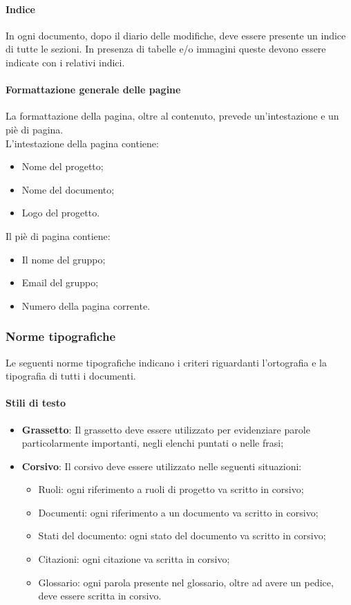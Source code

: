 \paragraph{Indice}
In ogni documento, dopo il diario delle modifiche, deve essere presente un
indice di tutte le sezioni. In presenza di tabelle e/o immagini queste devono
essere indicate con i relativi indici.

\paragraph{Formattazione generale delle pagine}
La formattazione della pagina, oltre al contenuto, prevede un'intestazione e un
piè di pagina. \\
L'intestazione della pagina contiene:
\begin{itemize}
  \item Nome del progetto;
  \item Nome del documento;
  \item Logo del progetto.
\end{itemize}
Il piè di pagina contiene:
\begin{itemize}
  \item Il nome del gruppo;
  \item Email del gruppo;
  \item Numero della pagina corrente.
\end{itemize}

\subsubsection{Norme tipografiche}
Le seguenti norme tipografiche indicano i criteri riguardanti
l'ortografia e la tipografia di tutti i documenti.
\paragraph{Stili di testo}
\begin{itemize}
  \item \textbf{Grassetto}: Il grassetto deve essere utilizzato per evidenziare parole
  particolarmente importanti, negli elenchi puntati o nelle frasi;
  \item \textbf{Corsivo}: Il corsivo deve essere utilizzato nelle seguenti
  situazioni:
  \begin{itemize}
    \item Ruoli: ogni riferimento a ruoli di progetto va scritto in corsivo;
    \item Documenti: ogni riferimento a un documento va scritto in corsivo;
    \item Stati del documento: ogni stato del documento va scritto in corsivo;
    \item Citazioni: ogni citazione va scritta in corsivo;
    \item Glossario: ogni parola presente nel glossario, oltre ad avere un pedice, deve
    essere scritta in corsivo.
  \end{itemize}
\end{itemize}
